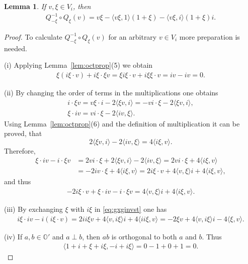 \documentclass[10pt,a4paper]{amsart}
\numberwithin{equation}{section}
\newtheorem{Lemma}[Theorem]{Lemma}
\newcommand{\SO}{\mathbb{O}} %
\begin{document}
\begin{Lemma}\label{lemma3.7}
 If $v, \xi \in V_i$, then
 \begin{gather*}
 Q_{-\xi}^{-1}\circ Q_\xi(v)=v \xi- \langle v \xi,1\rangle(1+\xi)- \langle v\xi ,i\rangle(1+\xi)i.
 \end{gather*}
\end{Lemma}
\begin{proof}
 To calculate $Q_{-\xi}^{-1}\circ Q_\xi(v)$ for an arbitrary $v \in V_i$ more preparation is needed.

(i) Applying Lemma~\ref{lem:octprop}(5) we obtain
 \begin{gather}
 \xi(i\xi \cdot v)+i\xi \cdot \xi v=\xi i \xi \cdot v + i\xi \xi \cdot v=iv-iv=0. \label{eq:gxginvst1}
 \end{gather}

(ii) By changing the order of terms in the multiplications one obtains
 \begin{gather*} i \cdot \xi v = v\xi \cdot i -2 \langle \xi v,i \rangle = - vi\cdot \xi - 2 \langle\xi v,i \rangle ,\\
 \xi \cdot iv=vi\cdot\xi-2\langle i v,\xi \rangle. \end{gather*}
 Using Lemma~\ref{lem:octprop}(6) and the definition of multiplication it can be proved, that
 \[ 2 \langle \xi v,i \rangle -2 \langle iv,\xi \rangle=4 \langle i\xi,v\rangle. \]
 Therefore,
 \begin{align}
 \xi \cdot iv - i\cdot \xi v&= 2 vi\cdot \xi + 2 \langle \xi v,i \rangle -2 \langle iv,\xi \rangle=2 vi\cdot \xi + 4 \langle i\xi,v\rangle \nonumber\\
 &=-2iv\cdot\xi+ 4 \langle i\xi,v\rangle=2i\xi \cdot v+4\langle v,\xi \rangle i+ 4 \langle i\xi,v\rangle , \label{eq:gxginvst}
 \end{align}
 and thus
 \begin{gather}
 -2 i\xi \cdot v+ \xi \cdot iv-i\cdot \xi v=4 \langle v, \xi \rangle i+4 \langle i\xi,v\rangle. \label{eq:gxginvst2}
 \end{gather}

(iii) By exchanging $\xi$ with $i\xi$ in \eqref{eq:gxginvst} one has
 \begin{gather}
 i\xi \cdot iv-i(i\xi \cdot v)=2 ii\xi v+4 \langle v, i\xi \rangle i+ 4 \langle ii\xi,v \rangle=-2 \xi v +4 \langle v, i\xi \rangle i- 4 \langle\xi,v\rangle .\label{eq:gxginvst3}
 \end{gather}

(iv) If $a,b \in \SO'$ and $a\perp b$, then $ab$ is orthogonal to both $a$ and $b$. Thus
 \begin{gather}
 \langle 1+i+\xi+i\xi ,-i+i\xi\rangle=0-1+0+1=0. \label{eq:gxginvst4}
 \end{gather}


\end{proof}
\end{document}
